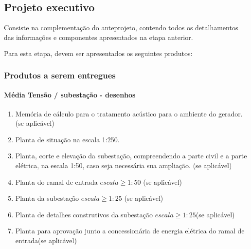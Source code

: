 \subsection{Projeto executivo} \label{subsection: etapa-projeto executivo}

Consiste na complementação do anteprojeto, contendo todos os detalhamentos das informações e componentes apresentados na etapa anterior.

Para esta etapa, devem ser apresentados os seguintes produtos:

\subsubsection{Produtos a serem entregues}

\paragraph{Média Tensão / subestação - desenhos}

	\begin{enumerate}
		\item Memória de cálculo para o tratamento acústico para o ambiente do gerador. (se aplicável)
		
		\item Planta de situação na escala 1:250.
		
		\item Planta, corte e elevação da subestação, compreendendo a parte civil e a parte elétrica, na escala 1:50, caso seja necessária sua ampliação. (se aplicável)
		
		\item Planta do ramal de entrada $escala \geq 1:50$ (se aplicável)
		
		\item Planta da subestação $escala \geq 1:25$ (se aplicável)
		
		\item Planta de detalhes construtivos da subestação $escala \geq 1:25$(se aplicável)
		
		\item Planta para aprovação junto a concessionária de energia elétrica do ramal de entrada(se aplicável)
	\end{enumerate}

